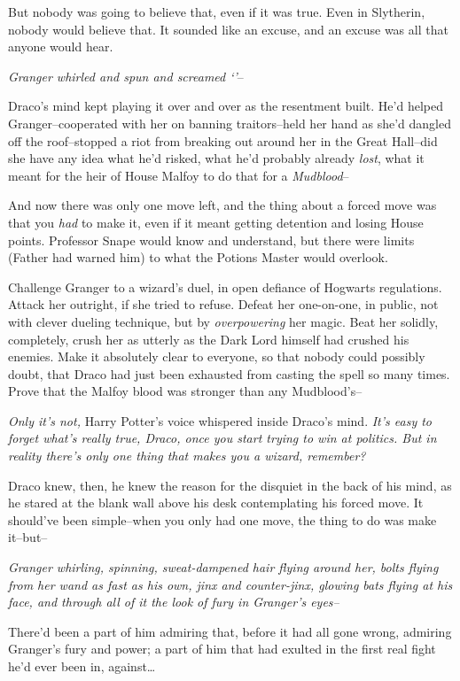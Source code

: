 But nobody was going to believe that, even if it was true. Even in Slytherin, nobody would believe that. It sounded like an excuse, and an excuse was all that anyone would hear.

\emph{Granger whirled and spun and screamed `'}\---

Draco's mind kept playing it over and over as the resentment built. He'd helped Granger\---cooperated with her on banning traitors\---held her hand as she'd dangled off the roof\---stopped a riot from breaking out around her in the Great Hall\---did she have any idea what he'd risked, what he'd probably already \emph{lost}, what it meant for the heir of House Malfoy to do that for a \emph{Mudblood}\---

And now there was only one move left, and the thing about a forced move was that you \emph{had} to make it, even if it meant getting detention and losing House points. Professor Snape would know and understand, but there were limits (Father had warned him) to what the Potions Master would overlook.

Challenge Granger to a wizard's duel, in open defiance of Hogwarts regulations. Attack her outright, if she tried to refuse. Defeat her one-on-one, in public, not with clever dueling technique, but by \emph{overpowering} her magic. Beat her solidly, completely, crush her as utterly as the Dark Lord himself had crushed his enemies. Make it absolutely clear to everyone, so that nobody could possibly doubt, that Draco had just been exhausted from casting the spell so many times. Prove that the Malfoy blood was stronger than any Mudblood's\---

\emph{Only it's not,} Harry Potter's voice whispered inside Draco's mind. \emph{It's easy to forget what's really true, Draco, once you start trying to win at politics. But in reality there's only one thing that makes you a wizard, remember?}

Draco knew, then, he knew the reason for the disquiet in the back of his mind, as he stared at the blank wall above his desk contemplating his forced move. It should've been simple\---when you only had one move, the thing to do was make it\---but\---

\emph{Granger whirling, spinning, sweat-dampened hair flying around her, bolts flying from her wand as fast as his own, jinx and counter-jinx, glowing bats flying at his face, and through all of it the look of fury in Granger's eyes\---}

There'd been a part of him admiring that, before it had all gone wrong, admiring Granger's fury and power; a part of him that had exulted in the first real fight he'd ever been in, against{\ldots}

